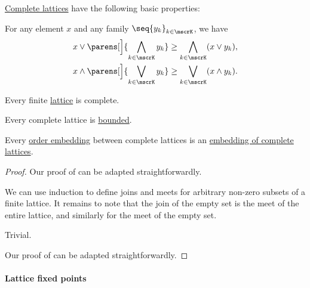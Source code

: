 \begin{proposition}\label{thm:def:complete_lattice}
  \hyperref[def:complete_lattice]{Complete lattices} have the following basic properties:
  \begin{thmenum}
     For any element \( x \) and any family \( \seq{ y_k }_{k \in \mscrK} \), we have
    \begin{align}
      x \vee \parens[\Big]{ \bigwedge_{k \in \mscrK} y_k } &\geq \bigwedge_{k \in \mscrK} (x \vee y_k), \label{eq:thm:def:complete_lattice/distributivity_inequality/join_over_meet} \\
      x \wedge \parens[\Big]{ \bigvee_{k \in \mscrK} y_k } &\geq \bigvee_{k \in \mscrK} (x \wedge y_k). \label{eq:thm:def:complete_lattice/distributivity_inequality/meet_over_join}
    \end{align}

     Every finite \hyperref[def:lattice]{lattice} is complete.

     Every complete lattice is \hyperref[def:extremal_points/bounds]{bounded}.

     Every \hyperref[def:preordered_set/homomorphism]{order embedding} between complete lattices is an \hyperref[def:lattice/homomorphism]{embedding of complete lattices}.
  \end{thmenum}
\end{proposition}
\begin{proof}
   Our proof of  can be adapted straightforwardly.

   We can use induction to define joins and meets for arbitrary non-zero subsets of a finite lattice. It remains to note that the join of the empty set is the meet of the entire lattice, and similarly for the meet of the empty set.

   Trivial.

   Our proof of  can be adapted straightforwardly.
\end{proof}

\paragraph{Lattice fixed points}

